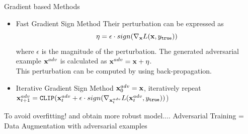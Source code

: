 \documentclass[xcolor=pdftex,dvipsnames,table,mathserif]{beamer}
\begin{document}



\begin{frame}{Gradient based Methods}
\begin{itemize}
\item Fast Gradient Sign Method \cite{Adversarial}
Their perturbation can be expressed as
\begin{equation}
\eta =\epsilon \cdot sign(\nabla_{\mathbf{x}} L (\mathbf{x},y_{\texttt{true}}))
\end{equation}
where $\epsilon$ is the magnitude of the perturbation.
The generated adversarial example $\mathbf{x}^{adv}$ is calculated as $\mathbf{x}^{adv}=\mathbf{x}+\eta$.\\
This perturbation can be computed by using back-propagation.
\item Iterative Gradient Sign Method \cite{kurakin2016adversarial}
$\mathbf{x}_{0}^{adv}=\mathbf{x}$, iteratively repeat $\mathbf{x}_{t+1}^{adv}=\texttt{CLIP} (\mathbf{x}_{t}^{adv} + \epsilon \cdot sign(\nabla_{\mathbf{x}_{t}^{adv}} L (\mathbf{x}_{t}^{adv},y_{\texttt{true}}))$)
\end{itemize}
\pause
\alert{To avoid overfitting! and obtain more robust model.... Adversarial Training = Data Augmentation with adversarial examples}
\end{frame}

\end{document}
